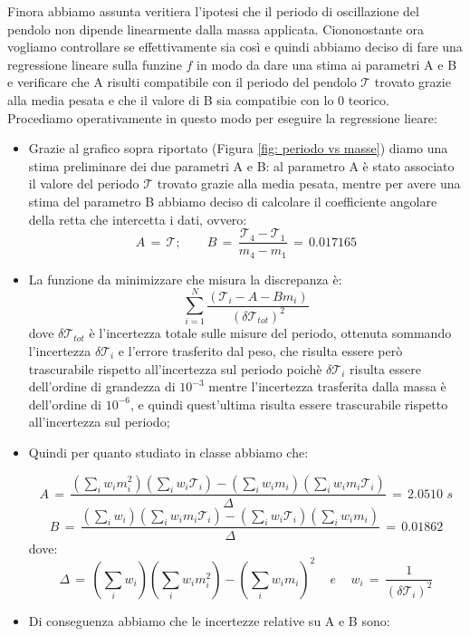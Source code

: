 Finora abbiamo assunta veritiera l'ipotesi che il periodo di oscillazione del pendolo non dipende linearmente dalla massa applicata. Ciononostante ora vogliamo controllare se effettivamente sia così e quindi abbiamo deciso di fare una regressione lineare sulla funzine $f$ in modo da dare una stima ai parametri A e B e verificare che A risulti compatibile con il periodo del pendolo $\mathcal{T}$ trovato grazie alla media pesata e che il valore di B sia compatibie con lo 0 teorico.\\

Procediamo operativamente in questo modo per eseguire la regressione lieare:

\begin{itemize}
	\item{Grazie al grafico sopra riportato (Figura \ref{fig: periodo vs masse}) diamo una stima preliminare dei due parametri A e B: al parametro A è stato associato il valore del periodo $\mathcal{T}$ trovato grazie alla media pesata, mentre per avere una stima del parametro B abbiamo deciso di calcolare il coefficiente angolare della retta che intercetta i dati, ovvero:
			\begin{equation*}
				A \,=\, \mathcal{T}; \quad \quad B \,=\, \frac{\mathcal{T}_4 - \mathcal{T}_1}{m_4 - m_1} \,=\, 0.017165
			\end{equation*}
			}
	\item{La funzione da minimizzare che misura la discrepanza è:
			\begin{equation}
                \sum_{i=1}^{N} \frac{(\mathcal{T}_i - A - B m_i)}{(\delta \mathcal{T}_{tot})^2}	
                \label{eq:min_quad}
			\end{equation}
            dove $\delta \mathcal{T}_{tot}$ è l'incertezza totale sulle misure del periodo, ottenuta sommando l'incertezza $\delta \mathcal{T}_i$ e l'errore trasferito dal peso, che risulta essere però trascurabile rispetto all'incertezza sul periodo poichè $\delta \mathcal{T}_i$ risulta essere dell'ordine di grandezza di $10^{-3}$ mentre l'incertezza trasferita dalla massa è dell'ordine di $10^{-6}$, e quindi quest'ultima risulta essere trascurabile rispetto all'incertezza sul periodo;}
	\item{Quindi per quanto studiato in classe abbiamo che:

			\begin{equation*}
				A \,=\, \frac{(\sum_i w_i m_i^2)(\sum_i w_i \mathcal{T}_i) - (\sum_i w_i m_i)(\sum_i w_i m_i \mathcal{T}_i)}{\Delta} \,=\, 2.0510 \,\, s
			\end{equation*}
			\begin{equation*}
				B \,=\, \frac{(\sum_i w_i)(\sum_i w_i m_i \mathcal{T}_i) - (\sum_i w_i \mathcal{T}_i)(\sum_i w_i m_i)}{\Delta} \,=\, 0.01862
			\end{equation*}
			dove:
			\begin{equation*}
				\Delta \,=\, (\sum_i w_i)(\sum_i w_i m_i^2) - (\sum_i w_i m_i)^2 \,\,\,\,\,\,\, e \,\,\,\,\,\,\,
				w_i \,=\, \frac{1}{(\delta \mathcal{T}_i)^2}
			\end{equation*}}
	\item{Di conseguenza abbiamo che le incertezze relative su A e B sono:

}
\end{itemize}
